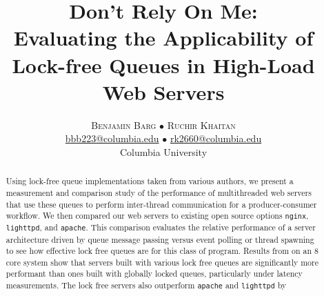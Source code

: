\documentclass[twoside,10pt]{article}
\title{\vspace{-15mm}%
  \fontsize{24pt}{10pt}\selectfont \textbf{Don't Rely On Me:}\\
  \textbf{Evaluating the Applicability of Lock-free Queues in High-Load Web
    Servers} }
\author{%
  \large
  \textsc{Benjamin Barg $\bullet$ Ruchir Khaitan}\\[2mm]
  \normalsize \href{mailto:bbb2123@columbia.edu}{bbb223@columbia.edu}
    $\bullet$ \href{mailto:rk2660@columbia.edu}{rk2660@columbia.edu}\\
  \normalsize	Columbia University
  \vspace{-5mm} }
\date{}
\begin{document}
\maketitle
\thispagestyle{fancy}

\begin{abstract}
  \noindent Using lock-free queue implementations taken from various
  authors, we present a measurement and comparison study of the
  performance of multithreaded web servers that use these queues to
  perform inter-thread communication for a producer-consumer
  workflow. We then compared our web servers to existing open source
  options \verb+nginx+, \verb+lighttpd+, and \verb+apache+. This
  comparison evaluates the relative performance of a server
  architecture driven by queue message passing versus event polling or
  thread spawning to see how effective lock free queues are for this
  class of program. Results from on an 8 core system show that servers
  built with various lock free queues are significantly more
  performant than ones built with globally locked queues, particularly
  under latency measurements. The lock free servers also outperform
  \verb+apache+ and \verb+lighttpd+ by 
\end{abstract}
\end{document}
